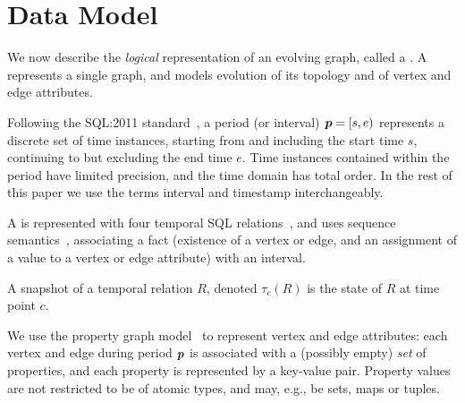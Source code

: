 \section{Data Model}
\label{sec:model}

We now describe the {\em
  logical} representation of an evolving graph, called a \tg.  A \tg
represents a single graph, and models evolution of its topology and of
vertex and edge attributes.  

Following the SQL:2011
standard~\cite{DBLP:journals/sigmod/KulkarniM12}, a period (or
interval) $\boldsymbol{p} = [s, e)$ represents a discrete set of time instances,
  starting from and including the start time $s$, continuing to but
  excluding the end time $e$.  Time instances contained within the
  period have limited precision, and the time domain has total order.
  In the rest of this paper we use the terms interval and timestamp
  interchangeably.


A \tg is represented with four temporal SQL
relations~\cite{DBLP:conf/vldb/BohlenSS96}, and uses sequence
semantics~\cite{Dignos2012}, associating a fact (existence of a vertex
or edge, and an assignment of a value to a vertex or edge attribute)
with an interval.

A snapshot of a temporal relation $R$, denoted $\tau_c(R)$ is the
state of $R$ at time point $c$.

We use the property graph model~\cite{GraphDB} to represent vertex and
edge attributes: each vertex and edge during period $\boldsymbol{p}$ is
associated with a (possibly empty) {\em set} of properties, and each
property is represented by a key-value pair.  Property values are not
restricted to be of atomic types, and may, e.g., be sets, maps or
tuples.

